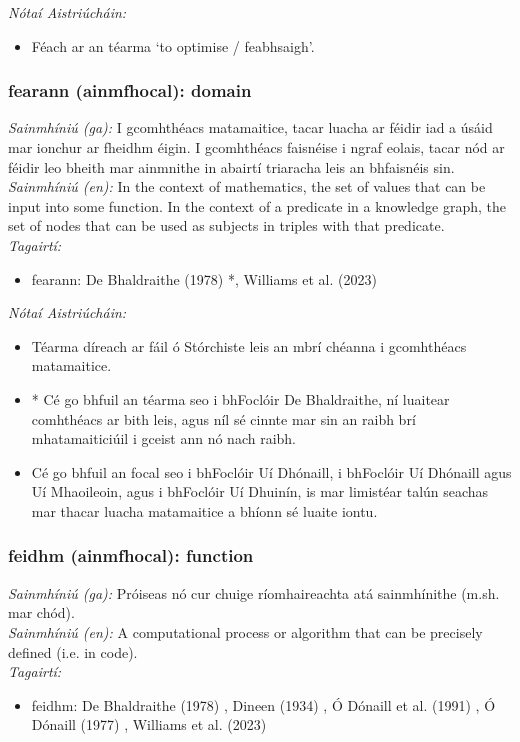\documentclass{article}
\begin{document}
 \noindent \textit{Nótaí Aistriúcháin:}
\begin{itemize}
	\item Féach ar an téarma `to optimise / feabhsaigh'.
\end{itemize}


\subsubsection*{fearann (ainmfhocal): domain}
 \noindent \textit{Sainmhíniú (ga):} I gcomhthéacs matamaitice, tacar luacha ar féidir iad a úsáid mar ionchur ar fheidhm éigin. I gcomhthéacs faisnéise i ngraf eolais, tacar nód ar féidir leo bheith mar ainmnithe in abairtí triaracha leis an bhfaisnéis sin.
\\
 \noindent \textit{Sainmhíniú (en):} In the context of mathematics, the set of values that can be input into some function. In the context of a predicate in a knowledge graph, the set of nodes that can be used as subjects in triples with that predicate.
\\
 \noindent \textit{Tagairtí:}
\begin{itemize}
	\item fearann: De Bhaldraithe (1978) \cite{de-bhaldraithe}*, Williams et al. (2023) \cite{storchiste}
\end{itemize}

 \noindent \textit{Nótaí Aistriúcháin:}
\begin{itemize}
	\item Téarma díreach ar fáil ó Stórchiste leis an mbrí chéanna i gcomhthéacs matamaitice.
	\item * Cé go bhfuil an téarma seo i bhFoclóir De Bhaldraithe, ní luaitear comhthéacs ar bith leis, agus níl sé cinnte mar sin an raibh brí mhatamaiticiúil i gceist ann nó nach raibh.
	\item Cé go bhfuil an focal seo i bhFoclóir Uí Dhónaill, i bhFoclóir Uí Dhónaill agus Uí Mhaoileoin, agus i bhFoclóir Uí Dhuinín, is mar limistéar talún seachas mar thacar luacha matamaitice a bhíonn sé luaite iontu.
\end{itemize}


\subsubsection*{feidhm (ainmfhocal): function}
 \noindent \textit{Sainmhíniú (ga):} Próiseas nó cur chuige ríomhaireachta atá sainmhínithe (m.sh. mar chód).
\\
 \noindent \textit{Sainmhíniú (en):} A computational process or algorithm that can be precisely defined (i.e. in code).
\\
 \noindent \textit{Tagairtí:}
\begin{itemize}
	\item feidhm: De Bhaldraithe (1978) \cite{de-bhaldraithe}, Dineen (1934) \cite{dineen}, Ó Dónaill et al. (1991) \cite{focloir-beag}, Ó Dónaill (1977) \cite{odonaill}, Williams et al. (2023) \cite{storchiste}
\end{itemize}
\end{document}
